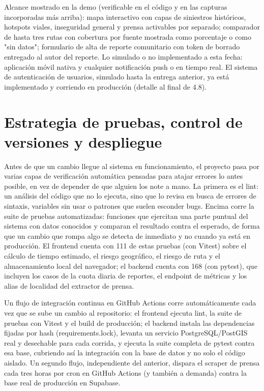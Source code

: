 Alcance mostrado en la demo (verificable en el código y en las capturas
incorporadas más arriba): mapa interactivo con capas de siniestros
históricos, hotspots viales, inseguridad general y prensa activables por
separado; comparador de hasta tres rutas con cobertura por fuente
mostrada como porcentaje o como "sin datos"; formulario de alta de
reporte comunitario con token de borrado entregado al autor del reporte.
Lo simulado o no implementado a esta fecha: aplicación móvil nativa y
cualquier notificación push o en tiempo real. El sistema de
autenticación de usuarios, simulado hasta la entrega anterior, ya está
implementado y corriendo en producción (detalle al final de 4.8).

\section{Estrategia de pruebas, control de versiones y despliegue}

Antes de que un cambio llegue al sistema en funcionamiento, el proyecto
pasa por varias capas de verificación automática pensadas para atajar
errores lo antes posible, en vez de depender de que alguien los note a
mano. La primera es el lint: un análisis del código que no lo ejecuta,
sino que lo revisa en busca de errores de sintaxis, variables sin usar o
patrones que suelen esconder bugs. Encima corre la suite de pruebas
automatizadas: funciones que ejercitan una parte puntual del sistema con
datos conocidos y comparan el resultado contra el esperado, de forma que
un cambio que rompa algo se detecta de inmediato y no cuando ya está en
producción. El frontend cuenta con 111 de estas pruebas (con Vitest)
sobre el cálculo de tiempo estimado, el riesgo geográfico, el riesgo de
ruta y el almacenamiento local del navegador; el backend cuenta con 168
(con pytest), que incluyen los casos de la cuota diaria de reportes, el
endpoint de métricas y los alias de localidad del extractor de prensa.

Un flujo de integración continua en GitHub Actions corre automáticamente
cada vez que se sube un cambio al repositorio: el frontend ejecuta lint,
la suite de pruebas con Vitest y el build de producción; el backend
instala las dependencias fijadas por hash (requirements.lock), levanta
un servicio PostgreSQL/PostGIS real y desechable para cada corrida, y
ejecuta la suite completa de pytest contra esa base, cubriendo así la
integración con la base de datos y no solo el código aislado. Un segundo
flujo, independiente del anterior, dispara el scraper de prensa cada
tres horas por cron en GitHub Actions (y también a demanda) contra la
base real de producción en Supabase.

